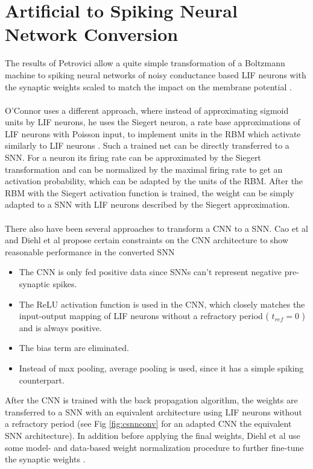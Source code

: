 \section{Artificial to Spiking Neural Network Conversion} \label{c:nnconversion}

The results of Petrovici allow a quite simple transformation of a Boltzmann machine to spiking neural networks of noisy conductance based LIF neurons with the synaptic weights scaled to match the impact on the membrane potential \cite{Petrovici2016}.
\\
\\
O'Connor uses a different approach, where instead of approximating sigmoid units by LIF neurons, he uses the Siegert neuron, a rate base approximations of LIF neurons with Poisson input, to implement units in the RBM which activate similarly to LIF neurons \cite{OConnor2013}. 
Such a trained net can be directly transferred to a SNN.
For a neuron its firing rate can be approximated by the Siegert transformation and can be normalized by the maximal firing rate to get an activation probability, which can be adapted by the units of the RBM. 
After the RBM with the Siegert activation function is trained, the weight can be simply adapted to a SNN with LIF neurons described by the Siegert approximation.
\\
\\
There also have been several approaches to transform a CNN to a SNN.  
Cao et al and Diehl et al propose certain constraints on the CNN architecture to show reasonable performance in the converted SNN \cite{Cao2014}\cite{Diehl2015}
\begin{itemize}
\item The CNN is only fed positive data since SNNs can't represent negative pre-synaptic spikes. 
\item The ReLU activation function is used in the CNN, which closely matches the input-output mapping of LIF neurons without a refractory period ( $t_{ref}=0$ ) and is always positive.
\item The bias term are eliminated.
\item Instead of max pooling, average pooling is used, since it has a simple spiking counterpart.
\end{itemize}
After the CNN is trained with the back propagation algorithm, the weights are transferred to a SNN with an equivalent architecture using LIF neurons without a refractory period (see Fig \ref{fig:csnnconv} for an adapted CNN the equivalent SNN architecture). 
In addition before applying the final weights, Diehl et al use some model- and data-based weight normalization procedure to further fine-tune the synaptic weights \cite{Diehl2015}. 

